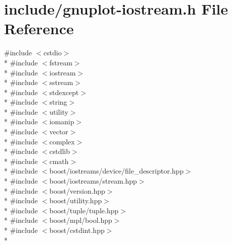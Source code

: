 \hypertarget{gnuplot-iostream_8h}{}\section{include/gnuplot-\/iostream.h File Reference}
\label{gnuplot-iostream_8h}
{\ttfamily \#include $<$cstdio$>$}\\*
{\ttfamily \#include $<$fstream$>$}\\*
{\ttfamily \#include $<$iostream$>$}\\*
{\ttfamily \#include $<$sstream$>$}\\*
{\ttfamily \#include $<$stdexcept$>$}\\*
{\ttfamily \#include $<$string$>$}\\*
{\ttfamily \#include $<$utility$>$}\\*
{\ttfamily \#include $<$iomanip$>$}\\*
{\ttfamily \#include $<$vector$>$}\\*
{\ttfamily \#include $<$complex$>$}\\*
{\ttfamily \#include $<$cstdlib$>$}\\*
{\ttfamily \#include $<$cmath$>$}\\*
{\ttfamily \#include $<$boost/iostreams/device/file\+\_\+descriptor.\+hpp$>$}\\*
{\ttfamily \#include $<$boost/iostreams/stream.\+hpp$>$}\\*
{\ttfamily \#include $<$boost/version.\+hpp$>$}\\*
{\ttfamily \#include $<$boost/utility.\+hpp$>$}\\*
{\ttfamily \#include $<$boost/tuple/tuple.\+hpp$>$}\\*
{\ttfamily \#include $<$boost/mpl/bool.\+hpp$>$}\\*
{\ttfamily \#include $<$boost/cstdint.\+hpp$>$}\\*
